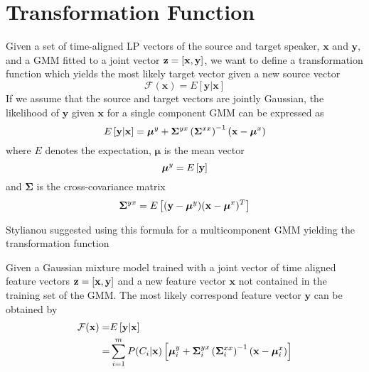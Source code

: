 \section{Transformation Function} %
\label{sec:transformation_function}
Given a set of time-aligned LP vectors of the source and target speaker, $\mathbf{x}$ and $\mathbf{y}$, and a GMM fitted to a joint vector $\mathbf{z}=\left[\mathbf{x},\mathbf{y}\right]$, we want to define a transformation function which yields the most likely target vector given a new source vector
\newcommand{\fff}{\mathcal F}
\begin{equation}
	\fff(\mathbf{x}) = E[\mathbf{y}\vert \mathbf{x}]
\end{equation}
If we assume that the source and target vectors are jointly Gaussian, the likelihood of $\mathbf{y}$ given $\mathbf{x}$ for a single component GMM can be expressed as \cite{kay93}
\begin{equation}
	E \left[\mathbf{y}\vert \mathbf{x}\right] = \boldsymbol{\mu}^y + \mathbf{\Sigma}^{yx} \left(\mathbf{\Sigma}^{xx}\right)^{-1} (\mathbf{x}-\boldsymbol{\mu}^x)
\end{equation}
where $E$ denotes the expectation, $\boldsymbol{\mu}$ is the mean vector
\begin{equation}
	\boldsymbol{\mu}^y = E\left[\mathbf{y}\right]
\end{equation}
and $\mathbf{\Sigma}$ is the cross-covariance matrix
\begin{equation}
	\mathbf{\Sigma}^{yx} = E \left[(\mathbf{y}-\boldsymbol{\mu}^y)(\mathbf{x}-\boldsymbol{\mu}^x)^T\right]
\end{equation}

Stylianou \etal \cite{stylianou95} suggested using this formula for a multicomponent GMM yielding the transformation function
\begin{definition}
	Given a Gaussian mixture model trained with a joint vector of time aligned feature vectors $\mathbf{z} = \left[\mathbf{x},\mathbf{y}\right]$ and a new feature vector $\mathbf{x}$ not contained in the training set of the GMM. The most likely correspond feature vector $\mathbf{y}$ can be obtained by
	\begin{equation}
		\label{eq:conversion_function}
		\begin{split}
			\fff(\mathbf{x}) =& E \sbrackets{\mathbf{y}\vert \mathbf{x}}\\
			=& \sum_{i=1}^{m}P(C_i \vert \mathbf{x})\sbrackets{ \boldsymbol{\mu}_i^y + \mathbf{\Sigma}_i^{yx} \pbrackets{\mathbf{\Sigma}_i^{xx}}^{-1} (\mathbf{x}-\boldsymbol{\mu}_i^x)}
		\end{split}
	\end{equation}
\end{definition}

